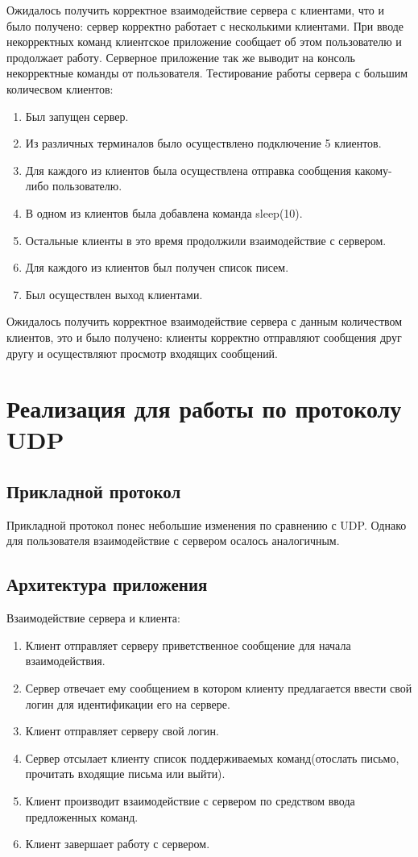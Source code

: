 \documentclass[12pt,a4paper]{report}
\begin{document}
Ожидалось получить корректное взаимодействие сервера с клиентами, что и было получено: сервер корректно работает с несколькими клиентами.
При вводе некорректных команд клиентское приложение сообщает об этом пользователю и продолжает работу. Серверное приложение так же выводит на консоль некорректные команды от пользователя.
\linebreak
\linebreak
Тестирование работы сервера с большим количесвом клиентов:
\begin{enumerate}
\item Был запущен сервер.
\item Из различных терминалов было осуществлено подключение 5 клиентов.
\item Для каждого из клиентов была осуществлена отправка сообщения какому-либо пользователю.
\item В одном из клиентов была добавлена команда sleep(10).
\item Остальные клиенты в это время продолжили взаимодействие с сервером.
\item Для каждого из клиентов был получен список писем.
\item Был осуществлен выход клиентами.
\end{enumerate}


Ожидалось получить корректное взаимодействие сервера с данным количеством клиентов, это и было получено: клиенты корректно отправляют сообщения друг другу и осуществляют просмотр входящих сообщений.
\chapter{Реализация для работы по протоколу UDP}
\section{Прикладной протокол}
Прикладной протокол понес небольшие изменения по сравнению с UDP. Однако для пользователя взаимодействие с сервером осалось аналогичным.


\section{Архитектура приложения}
Взаимодействие сервера и клиента:
\begin{enumerate}
\item Клиент отправляет серверу приветственное сообщение для начала взаимодействия.
\item Сервер отвечает ему сообщением в котором клиенту предлагается ввести свой логин для идентификации его на сервере.
\item Клиент отправляет серверу свой логин.
\item Сервер отсылает клиенту список поддерживаемых команд(отослать письмо, прочитать входящие письма или выйти).
\item Клиент производит взаимодействие с сервером по средством ввода предложенных команд.
\item Клиент завершает работу с сервером.
\end{enumerate}
\end{document}
